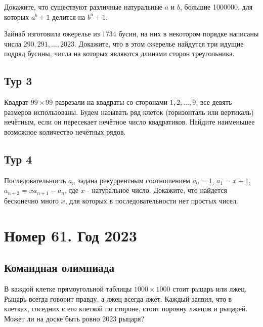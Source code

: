 \documentclass[11pt, a4paper]{problems_template}
\begin{document}
\begin{exercise}
Докажите, что существуют различные натуральные $a$ и $b$, большие 1000000, для которых $a^{b} + 1$ делится на $b^{a} + 1$.
\end{exercise}

\begin{exercise}
Зайнаб изготовила ожерелье из 1734 бусин, на них в некотором порядке написаны числа $290, 291, \dots, 2023$. Докажите, что в этом ожерелье найдутся три идущие подряд бусины, числа на которых являются длинами сторон треугольника.
\end{exercise}

\section{Тур 3}

\begin{exercise}
Квадрат $99 \times 99$ разрезали на квадраты со сторонами $1, 2, \dots, 9$, все девять размеров использованы. Будем называть ряд клеток (горизонталь или вертикаль) нечётным, если он пересекает нечётное число квадратиков. Найдите наименьшее возможное количество нечётных рядов.
\end{exercise}

\section{Тур 4}

\begin{exercise}
Последовательность $a_{n}$ задана рекуррентным соотношением $a_{0} = 1$, $a_{1} = x + 1$, $a_{n+2} = xa_{n+1} - a_{n}$, где $x$ - натуральное число. Докажите, что найдется бесконечно много $x$, для которых в последовательности нет простых чисел.
\end{exercise}

\chapter{Номер 61. Год 2023}

\section{Командная олимпиада}

\begin{exercise}
В каждой клетке прямоугольной таблицы $1000 \times 1000$ стоит рыцарь или лжец. Рыцарь всегда говорит правду, а лжец всегда лжёт. Каждый заявил, что в клетках, соседних с его клеткой по стороне, стоит поровну лжецов и рыцарей. Может ли на доске быть ровно 2023 рыцаря?
\end{exercise}
\end{document}
